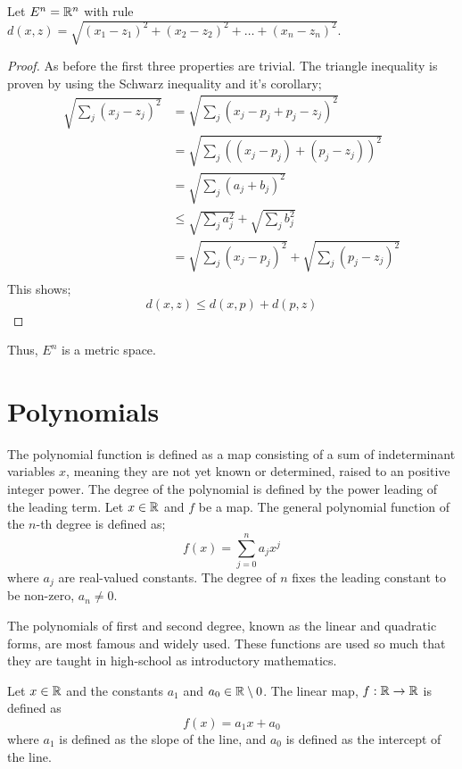 \begin{example}
    Let $E^n = \mathbb{R}^n$ with rule $d(x, z) = \sqrt{(x_1 - z_1)^2 + (x_2 - z_2)^2 + \dots + (x_n - z_n)^2}$. 
    \begin{proof}
        As before the first three properties are trivial. The triangle inequality is proven by using the Schwarz inequality and it's corollary;
        \begin{align*}
            \sqrt{\sum_j (x_j - z_j)^2} &=  \sqrt{\sum_j (x_j - p_j+p_j - z_j)^2} \\
            &=  \sqrt{\sum_j ((x_j - p_j)+ (p_j - z_j))^2} \\
            &=  \sqrt{\sum_j (a_j+ b_j)^2} \\
            &\leq \sqrt{\sum_j a_j^2} +\sqrt{\sum_j b_j^2} \\
            &= \sqrt{\sum_j (x_j - p_j)^2} +\sqrt{\sum_j (p_j - z_j)^2} \\
        \end{align*}
        This shows;
        \begin{equation}
            d(x,z) \leq d(x, p) + d(p, z)
        \end{equation}
    \end{proof}
    Thus, $E^n$ is a metric space. 
\end{example}


\section{Polynomials}

The polynomial function is defined as a map consisting of a sum of indeterminant variables $x$, meaning they are not yet known or determined, raised to an positive integer power. The degree of the polynomial is defined by the power leading of the leading term. Let $x\in \mathbb{R}$ and $f$ be a map. The general polynomial function of the $n$-th degree is defined as;
\begin{equation}
    f(x) = \sum_{j=0}^{n}a_j x^j
\end{equation}
where $a_j$ are real-valued constants. The degree of $n$ fixes the leading constant to be non-zero, $a_n \neq 0$.

The polynomials of first and second degree, known as the linear and quadratic forms, are most famous and widely used. These functions are used so much that they are taught in high-school as introductory mathematics. 

\begin{definition}
    Let $x\in\mathbb{R}$ and the constants $a_1$ and $a_0 \in \mathbb{R} \setminus 0$. The linear map, $f:\mathbb{R} \rightarrow \mathbb{R}$ is defined as
    \begin{equation}
        f(x) = a_1 x + a_0
    \end{equation}
    where $a_1$ is defined as the slope of the line, and $a_0$ is defined as the intercept of the line. 
\end{definition} 



